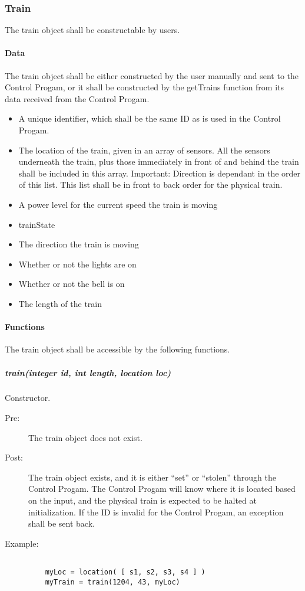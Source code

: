 \documentclass[a4paper,11pt,notitlepage]{article}
\def\CS{Control Progam\xspace}
\begin{document}
\subsubsection{Train}
The train object shall be constructable by users.
\paragraph{Data}
The train object shall be either constructed by the user manually and sent to the \CS, or it shall be constructed by the getTrains function from its data received from the \CS.
\begin{itemize}
\item A unique identifier, which shall be the same ID as is used in the \CS.
\item The location of the train, given in an array of sensors. All the sensors underneath the train, plus those immediately in front of and behind the train shall be included in this array. Important: Direction is dependant in the order of this list. This list shall be in front to back order for the physical train.
\item A power level for the current speed the train is moving
\item trainState
\item The direction the train is moving
\item Whether or not the lights are on
\item Whether or not the bell is on
\item The length of the train
\end{itemize}
\paragraph{Functions}
The train object shall be accessible by the following functions.
\subparagraph{train(integer id, int length, location loc)} Constructor. 
\begin{description}
\item[\hspace{1cm}Pre:] The train object does not exist. 
\item[\hspace{1cm}Post:] The train object exists, and it is either ``set'' or ``stolen'' through the \CS. The \CS will know where it is located based on the input, and the physical train is expected to be halted at initialization. If the ID is invalid for the \CS, an exception shall be sent back.
\item[\hspace{1cm}Example:]
\begin{verbatim}

	myLoc = location( [ s1, s2, s3, s4 ] )
    myTrain = train(1204, 43, myLoc)
\end{verbatim}
\end{description}
\end{document}
